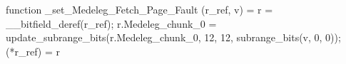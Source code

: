 function _set_Medeleg_Fetch_Page_Fault (r_ref, v) = {
    r = __bitfield_deref(r_ref);
    r.Medeleg_chunk_0 = update_subrange_bits(r.Medeleg_chunk_0, 12, 12, subrange_bits(v, 0, 0));
    (*r_ref) = r
}
